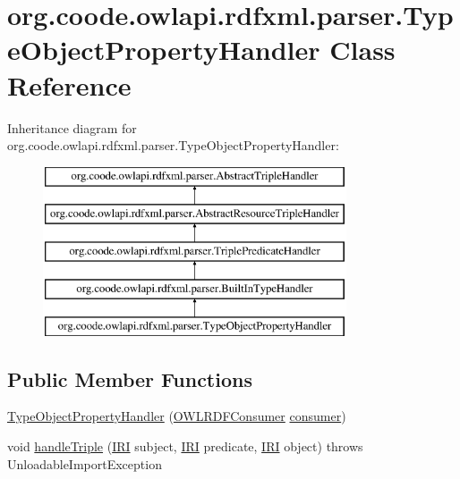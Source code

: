 \hypertarget{classorg_1_1coode_1_1owlapi_1_1rdfxml_1_1parser_1_1_type_object_property_handler}{\section{org.\-coode.\-owlapi.\-rdfxml.\-parser.\-Type\-Object\-Property\-Handler Class Reference}
\label{classorg_1_1coode_1_1owlapi_1_1rdfxml_1_1parser_1_1_type_object_property_handler}
}
Inheritance diagram for org.\-coode.\-owlapi.\-rdfxml.\-parser.\-Type\-Object\-Property\-Handler\-:\begin{figure}[H]
\begin{center}
\leavevmode
\includegraphics[height=5.000000cm]{classorg_1_1coode_1_1owlapi_1_1rdfxml_1_1parser_1_1_type_object_property_handler}
\end{center}
\end{figure}
\subsection*{Public Member Functions}
\begin{DoxyCompactItemize}
\item 
\hyperlink{classorg_1_1coode_1_1owlapi_1_1rdfxml_1_1parser_1_1_type_object_property_handler_ad7e40b23d28ef7e9ec36581673529006}{Type\-Object\-Property\-Handler} (\hyperlink{classorg_1_1coode_1_1owlapi_1_1rdfxml_1_1parser_1_1_o_w_l_r_d_f_consumer}{O\-W\-L\-R\-D\-F\-Consumer} \hyperlink{classorg_1_1coode_1_1owlapi_1_1rdfxml_1_1parser_1_1_abstract_triple_handler_a4ccf4d898ff01eb1cadfa04b23d54e9c}{consumer})
\item 
void \hyperlink{classorg_1_1coode_1_1owlapi_1_1rdfxml_1_1parser_1_1_type_object_property_handler_a414ad6903f3b02ec3274a5f1d462f841}{handle\-Triple} (\hyperlink{classorg_1_1semanticweb_1_1owlapi_1_1model_1_1_i_r_i}{I\-R\-I} subject, \hyperlink{classorg_1_1semanticweb_1_1owlapi_1_1model_1_1_i_r_i}{I\-R\-I} predicate, \hyperlink{classorg_1_1semanticweb_1_1owlapi_1_1model_1_1_i_r_i}{I\-R\-I} object)  throws Unloadable\-Import\-Exception 
\end{DoxyCompactItemize}
